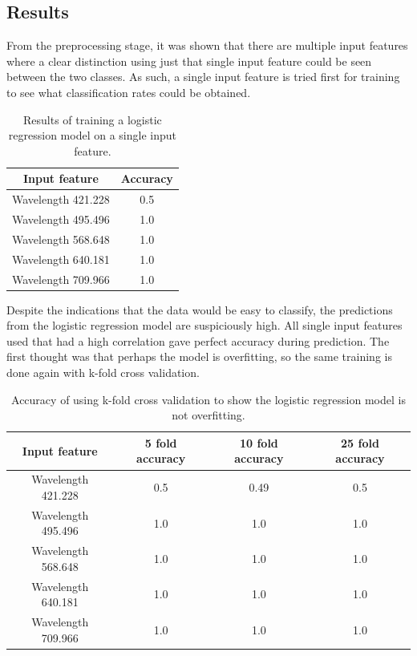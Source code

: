 \documentclass{article}
\begin{document}
\subsection{Results}
From the preprocessing stage, it was shown that there are multiple input features where a clear distinction using just that single input feature could be seen between the two classes. As such, a single input feature is tried first for training to see what classification rates could be obtained. 
\begin{table}[H]
\centering
\begin{tabular}{| c | c |}
\hline
\textbf{Input feature} & \textbf{Accuracy} \\
\hline
Wavelength 421.228 & 0.5 \\
\hline
Wavelength 495.496 & 1.0 \\
\hline
Wavelength 568.648 & 1.0 \\
\hline
Wavelength 640.181 & 1.0 \\
\hline
Wavelength 709.966 & 1.0 \\
\hline
\end{tabular}
\caption{Results of training a logistic regression model on a single input feature.}
\end{table}
\noindent
Despite the indications that the data would be easy to classify, the predictions from the logistic regression model are suspiciously high. All single input features used that had a high correlation gave perfect accuracy during prediction. The first thought was that perhaps the model is overfitting, so the same training is done again with k-fold cross validation. 
\begin{table}[H]
\centering
\begin{tabular}{| c | c | c | c |}
\hline
\textbf{Input feature} & \textbf{5 fold accuracy} & \textbf{10 fold accuracy} & \textbf{25 fold accuracy} \\
\hline
Wavelength 421.228 & 0.5 & 0.49 & 0.5 \\
\hline
Wavelength 495.496 & 1.0 & 1.0 & 1.0 \\
\hline
Wavelength 568.648 & 1.0 & 1.0 & 1.0 \\
\hline
Wavelength 640.181 & 1.0 & 1.0 & 1.0 \\
\hline
Wavelength 709.966 & 1.0 & 1.0 & 1.0 \\
\hline
\end{tabular}
\caption{Accuracy of using k-fold cross validation to show the logistic regression model is not overfitting.}
\end{table}
\end{document}

